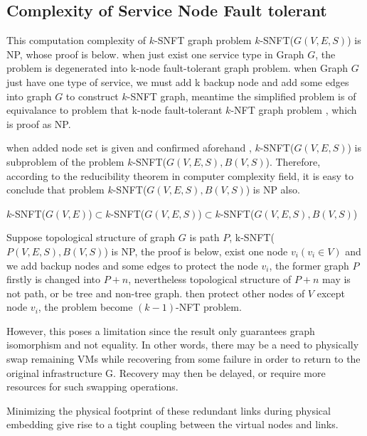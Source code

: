

\subsection{Complexity of Service Node Fault tolerant}
\label{sec:Complexity}
This computation complexity of $k$-SNFT graph problem $k$-SNFT($G(V,E,S)$) is NP, whose proof is below. when just exist one service type in Graph $G$, the problem is degenerated into k-node fault-tolerant graph problem. when Graph $G$ just have one type of service, we must add k backup node and add some edges into graph $G$ to construct $k$-SNFT graph, meantime the simplified problem is of equivalance to problem that k-node fault-tolerant $k$-NFT graph problem , which is proof as NP\cite{harary1996node}.

when added node set is given and confirmed aforehand , $k$-SNFT($G(V,E,S)$) is subproblem of the problem $k$-SNFT($G(V,E,S),B(V,S)$). Therefore, according to  the  reducibility theorem\cite{cormen2009introduction} in computer complexity field, it is easy to conclude that problem $k$-SNFT($G(V,E,S),B(V,S)$) is NP also.

$k$-SNFT($G(V,E)$)$\subset$$k$-SNFT($G(V,E,S)$)$\subset$$k$-SNFT($G(V,E,S),B(V,S)$)

Suppose topological structure of graph $G$ is path $P$, k-SNFT($P(V,E,S),B(V,S)$) is NP, the proof is below, exist one node $v_i(v_i\in V)$ and we add backup nodes and some edges to protect the node $v_i$, the former graph $P$ firstly is changed into $P+n$, nevertheless topological structure of $P+n$ may is not path, or be tree and non-tree graph. then protect other nodes of $V$ except node $v_i$, the problem become $(k-1)$-NFT problem.



However, this poses a limitation since the result only guarantees graph isomorphism and not equality. In other words, there may be a need to physically swap remaining VMs while recovering from some failure in order to return to the original infrastructure G. Recovery may then be delayed, or require more resources for such swapping operations.

Minimizing the physical footprint of these redundant links during physical embedding give rise to a tight coupling between the virtual nodes and links.

